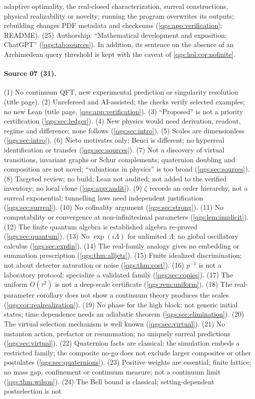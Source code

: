 \documentclass[11pt,oneside]{article}
\numberwithin{equation}{section}
\theoremstyle{plain}
\theoremstyle{definition}
\theoremstyle{remark}
\begin{document}
adaptive optimality, the real-closed characterization, surreal constructions, physical realizability or novelty; running the program overwrites its outputs; rebuilding changes PDF metadata and checksums (\cref{qgs:app:verification}; README). (25) Authorship: ``Mathematical development and exposition: ChatGPT'' (\cref{qgs:tab:sources}). In addition, its sentence on the absence of an Archimedean query threshold is kept with the caveat of \cref{qgs:hol:cor:nofinite}.

\paragraph{Source 07 (31).}
(1) No continuum QFT, new experimental prediction or singularity resolution (title page). (2) Unrefereed and AI-assisted; the checks verify selected examples; no new Lean (title page, \cref{qgs:app:verification}). (3) ``Proposed'' is not a priority certification (\cref{qgs:sec:ledger}). (4) New physics would need derivation, readout, regime and difference; none follows (\cref{qgs:sec:intro}). (5) Scales are dimensionless (\cref{qgs:sec:intro}). (6) Nieto motivates only; Benci is different; no hyperreal identification or transfer (\cref{qgs:sec:sources}). (7) Not a discovery of virtual transitions, invariant graphs or Schur complements; quaternion doubling and composition are not novel; ``valuations in physics'' is too broad (\cref{qgs:sec:sources}). (8) Targeted review; no build; Lean not audited; not added to the verified inventory; no local clone (\cref{qgs:app:audit}). (9) $\zeta$ records an order hierarchy, not a surreal exponential; tunnelling laws need independent justification (\cref{qgs:sec:surreal}). (10) No cofinality argument (\cref{qgs:sec:strong}). (11) No computability or convergence at non-infinitesimal parameters (\cref{qgs:lem:implicit}). (12) The finite quantum algebra is established algebra re-proved (\cref{qgs:sec:quantum}). (13) No $\exp(i\Lambda)$ for unlimited $\Lambda$; no global oscillatory calculus (\cref{qgs:sec:expfin}). (14) The real-family analogy gives no embedding or summation prescription (\cref{qgs:thm:alljets}). (15) Finite idealized discrimination; not about detector saturation or noise (\cref{qgs:thm:cost}). (16) $p^{-1}$ is not a laboratory protocol; specialize a validated family (\cref{qgs:sec:copies}). (17) The uniform $O(\tau^2)$ is not a deep-scale certificate (\cref{qgs:rem:uniform}). (18) The real-parameter corollary does not show a continuum theory produces the scales (\cref{qgs:cor:realrealization}). (19) No phase for the high block; not generic initial states; time dependence needs an adiabatic theorem (\cref{qgs:sec:elimination}). (20) The virtual selection mechanism is well known (\cref{qgs:sec:virtual}). (21) No instanton action, prefactor or resummation; no uniquely surreal predictions (\cref{qgs:sec:virtual}). (22) Quaternion facts are classical; the simulation embeds a restricted family; the composite no-go does not exclude larger composites or other postulates (\cref{qgs:sec:quaternions}). (23) Positive weights are essential; finite lattice; no mass gap, confinement or continuum measure; not a continuum limit (\cref{qgs:thm:wilson}). (24) The Bell bound is classical; setting-dependent postselection is not 
\end{document}
